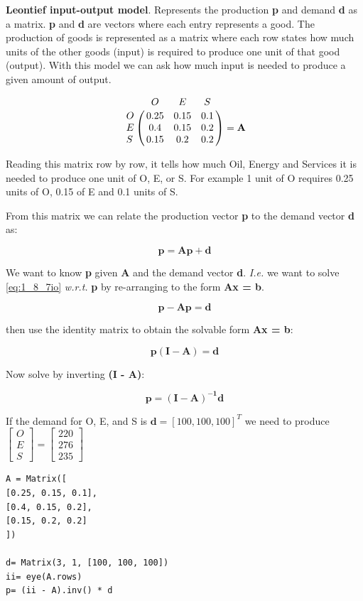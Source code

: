 \textbf{Leontief input-output model}. Represents the production \textbf{p} and
demand \textbf{d} as a matrix. \textbf{p} and \textbf{d} are vectors where each entry
represents a good. The production of goods is represented as a matrix where each row
states how much units of the other goods (input) is required to produce one unit
of that good (output). With this model we can ask how much input is needed to produce
a given amount of output.

$$
\bordermatrix{\text{}& O & E & S \cr
                 O & 0.25 &  0.15  & 0.1 \cr
                 E & 0.4  &  0.15  & 0.2 \cr
                 S & 0.15 &  0.2   & 0.2} = \mathbf{A}
$$

Reading this matrix row by row, it tells how much Oil, Energy and Services it is
needed to produce one unit of O, E, or S. For example 1 unit of O requires 0.25 units
of O, 0.15 of E and 0.1 units of S.

From this matrix we can relate the production vector \textbf{p} to the demand
vector \textbf{d} as:

\begin{equation}\label{eq:1_8_7io}
\mathbf{p} = \mathbf{Ap} + \mathbf{d}
\end{equation}


We want to know \textbf{p} given \textbf{A} and the demand vector \textbf{d}.
\emph{I.e.} we want to solve \ref{eq:1_8_7io} \emph{w.r.t.} \textbf{p} by re-arranging
to the form \textbf{Ax = b}.

$$\mathbf{
p - Ap = d
}$$

then use the identity matrix to obtain the solvable form \textbf{Ax = b}:

$$\mathbf{
p(I - A) = d
}$$

Now solve by inverting \textbf{(I - A)}:

$$\mathbf{
p = (I - A)^{-1} d
}$$

If the demand for O, E, and S is $\mathbf{d} = [100, 100, 100]^T$ we need to
produce
$\left[\begin{matrix}O \\ E \\ S \end{matrix}\right] = \left[\begin{matrix}220 \\ 276 \\ 235 \end{matrix}\right]$

\begin{verbatim}
A = Matrix([
[0.25, 0.15, 0.1],
[0.4, 0.15, 0.2],
[0.15, 0.2, 0.2]
])

d= Matrix(3, 1, [100, 100, 100])
ii= eye(A.rows)
p= (ii - A).inv() * d
\end{verbatim}



